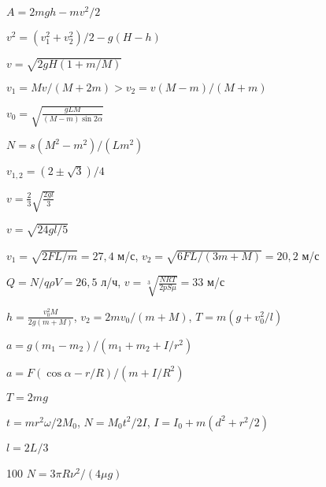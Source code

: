 \begin{Answer}{83}
$A=2mgh - mv^2/2$
\end{Answer}
\begin{Answer}{84}
$v^2 = (v_1^2 + v_2^2)/2 - g(H-h)$
\end{Answer}
\begin{Answer}{85}
$v = \sqrt{2gH(1+m/M)}$
\end{Answer}
\begin{Answer}{86}
$v_1 = Mv/(M+2m) > v_2 = v(M-m)/(M+m)$
\end{Answer}
\begin{Answer}{87}
$v_0 = \sqrt{\frac{gLM}{(M-m) \sin 2\alpha}}$
\end{Answer}
\begin{Answer}{88}
$N = s(M^2-m^2)/(Lm^2)$
\end{Answer}
\begin{Answer}{89}
$v_{1,2} = (2\pm \sqrt{3})/4$
\end{Answer}
\begin{Answer}{90}
$v = \frac{2}{3}\sqrt{\frac{2gl}{3}}$
\end{Answer}
\begin{Answer}{91}
$v = \sqrt{24gl/5}$
\end{Answer}
\begin{Answer}{92}
$v_1 = \sqrt{2FL/m}=27,4$ м/с, $v_2 = \sqrt{6FL/(3m+M)} = 20,2$ м/с
\end{Answer}
\begin{Answer}{93}
$Q = N/q \rho V = 26,5$ л/ч,  $v=\sqrt[3]{\frac{NRT}{2pS\mu}}=33$ м/с
\end{Answer}
\begin{Answer}{94}
$h= \frac{v_0^2 M}{2g(m+M)}$, $v_2 = 2mv_0/(m+M)$, $T=m(g+v_0^2/l)$
\end{Answer}
\begin{Answer}{95}
$a=g(m_1-m_2)/(m_1 +m_2 + I/r^2)$
\end{Answer}
\begin{Answer}{96}
$a = F(\cos \alpha - r/R)/(m+I/R^2)$
\end{Answer}
\begin{Answer}{97}
$T=2mg$
\end{Answer}
\begin{Answer}{98}
$t=mr^2\omega/2M_0$, $N=M_0t^2/2I$, $I = I_0+m(d^2+r^2/2)$
\end{Answer}
\begin{Answer}{99}
$l=2L/3$
\end{Answer}
\begin{Answer}{100}
$N=3 \pi R \nu^2/(4\mu g)$
\end{Answer}
